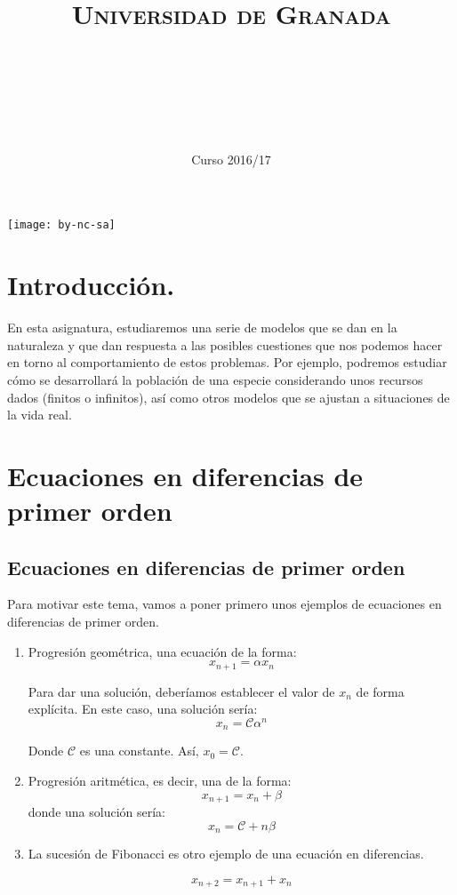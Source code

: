 \documentclass[11pt, a4paper]{article}
\title{
  \normalfont \normalsize 
  \textsc{Universidad de Granada} \\ [25pt]    %
  \horrule{0.5pt} \\[0.4cm] %
  \huge \sffamily\subject\\ %
  \horrule{2pt} \\[0.5cm] %
}
\author{\Large\sffamily{\docauthor}}
\date{\vspace{-1.5em} \normalsize \sffamily Curso 2016/17}
\newif\IfInSansMode
\numberwithin{equation}{section}
\theoremstyle{theorem-style}
\theoremstyle{definition-style}
\theoremstyle{remark-style}
\theoremstyle{example-style}
\begin{document}
\maketitle  %
\newpage
\tableofcontents    %
\vfill
\begin{center}
\texttt{[image: by-nc-sa]}  %
\end{center}
\newpage


\section*{Introducción.}
En esta asignatura, estudiaremos una serie de modelos que se dan en la naturaleza y que dan respuesta a las posibles cuestiones que nos podemos hacer en torno al comportamiento de estos problemas. Por ejemplo, podremos estudiar cómo se desarrollará la población de una especie considerando unos recursos dados (finitos o infinitos), así como otros modelos que se ajustan a situaciones de la vida real.



\newpage
\section{Ecuaciones en diferencias de primer orden}
\subsection[E.D. primer orden]{Ecuaciones en diferencias de primer orden}

Para motivar este tema, vamos a poner primero unos ejemplos de ecuaciones en diferencias de primer orden.

\begin{enumerate}
	\item Progresión geométrica, una ecuación de la forma:
\[
x_{n+1} =  \alpha x_n
\]

Para dar una solución, deberíamos establecer el valor de $x_n$ de forma explícita. En este caso, una solución sería:
\[
x_n = \mathcal{C} \alpha^n
\]

Donde $\mathcal{C}$ es una constante. Así, $x_0 = \mathcal{C}$.

\item Progresión aritmética, es decir, una de la forma:
\[
x_{n+1} = x_n + \beta
\]
donde una solución sería:
\[
x_n = \mathcal{C} + n\beta
\]

\item La sucesión de Fibonacci es otro ejemplo de una ecuación en diferencias.

\[
x_{n+2} = x_{n+1} + x_{n}
\]

\end{enumerate}
\end{document}

